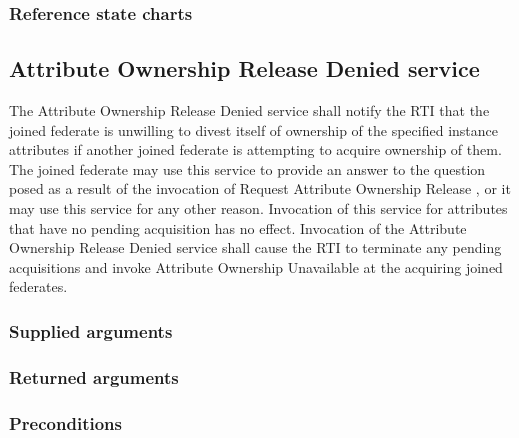 \begin{compactstdpage}

    \subsubsection{Reference state charts}



    \subsection{Attribute Ownership Release Denied service}


    The Attribute Ownership Release Denied service shall notify the RTI that the joined federate is unwilling to divest itself of ownership of the specified instance attributes if another joined federate is attempting to acquire ownership of them. The joined federate may use this service to provide an answer to the question posed as a result of the invocation of Request Attribute Ownership Release \rtiinitiated{}, or it may use this service for any other reason. Invocation of this service for attributes that have no pending acquisition has no effect. Invocation of the Attribute Ownership Release Denied service shall cause the RTI to terminate any pending acquisitions and invoke Attribute Ownership Unavailable at the acquiring joined federates.

    \subsubsection{Supplied arguments}



    \subsubsection{Returned arguments}



    \subsubsection{Preconditions}




\end{compactstdpage}
